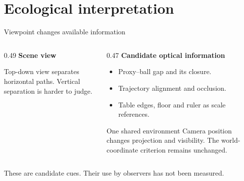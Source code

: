 \section{Ecological interpretation}
\begin{frame}{Viewpoint changes available information}
\begin{columns}[T,onlytextwidth]
\begin{column}{0.49\textwidth}
\centering\textbf{Scene view}\par\par\smallskip{}
\par\par\smallskip\raggedright\small
Top-down view separates horizontal paths. Vertical separation is harder to judge.
\end{column}
\begin{column}{0.47\textwidth}
\textbf{Candidate optical information}
\begin{itemize}\small
\item Proxy--ball gap and its closure.
\item Trajectory alignment and occlusion.
\item Table edges, floor and ruler as scale references.
\end{itemize}
\par\medskip
\begin{tbox}{One shared environment}
\small Camera position changes projection and visibility. The world-coordinate criterion remains unchanged.
\end{tbox}
\end{column}
\end{columns}
\par\medskip
{\small These are candidate cues. Their use by observers has not been measured.}
\end{frame}


